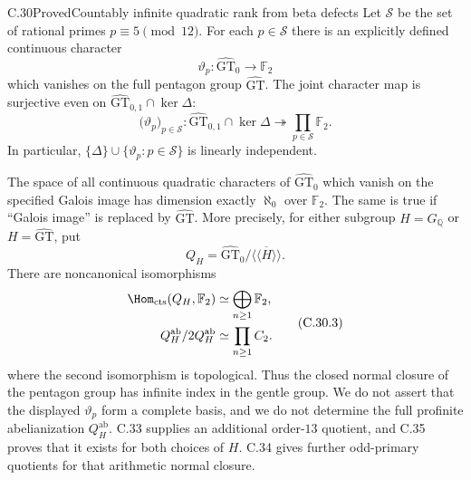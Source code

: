 \begin{statement}{C.30}{Proved}{Countably infinite quadratic rank from beta defects}
Let $\mathcal S$ be the set of rational primes $p\equiv5\pmod {12}$.
For each $p\in\mathcal S$ there is an explicitly defined continuous
character
\[
 \vartheta_p:\widehat{\mathrm{GT}}_0\longrightarrow\mathbb F_2
 \tag{C.30.1}
\]
which vanishes on the full pentagon group $\widehat{\mathrm{GT}}$.
The joint character map is surjective even on
$\widehat{\mathrm{GT}}_{0,1}\cap\ker\Delta$:
\[
 \bigl(\vartheta_p\bigr)_{p\in\mathcal S}:
 \widehat{\mathrm{GT}}_{0,1}\cap\ker\Delta
 \twoheadrightarrow\prod_{p\in\mathcal S}\mathbb F_2.
 \tag{C.30.2}
\]
In particular, $\{\Delta\}\cup\{\vartheta_p:p\in\mathcal S\}$
is linearly independent.

The space of all continuous quadratic characters of
$\widehat{\mathrm{GT}}_0$ which vanish on the specified Galois image
has dimension exactly $\aleph_0$ over $\mathbb F_2$. The same is true
if ``Galois image'' is replaced by $\widehat{\mathrm{GT}}$.
More precisely, for either subgroup $H=G_{\mathbb Q}$ or
$H=\widehat{\mathrm{GT}}$, put
\[
 Q_H=\widehat{\mathrm{GT}}_0/\overline{\langle\!\langle H\rangle\!\rangle}.
\]
There are noncanonical isomorphisms
\[
 \begin{aligned}
 \Hom_{\mathrm{cts}}(Q_H,\mathbb F_2)
       &\simeq\bigoplus_{n\geq1}\mathbb F_2,\\
 Q_H^{\mathrm{ab}}/2Q_H^{\mathrm{ab}}
       &\simeq\prod_{n\geq1}C_2.
 \end{aligned}
 \tag{C.30.3}
\]
where the second isomorphism is topological. Thus the closed normal
closure of the pentagon group has infinite index in the gentle group.
We do not assert that the displayed $\vartheta_p$ form a complete
basis, and we do not determine the full profinite abelianization
$Q_H^{\mathrm{ab}}$.
C.33 supplies an additional order-$13$ quotient, and C.35
proves that it exists for both choices of $H$.
C.34 gives further odd-primary quotients for that arithmetic
normal closure.
\end{statement}
